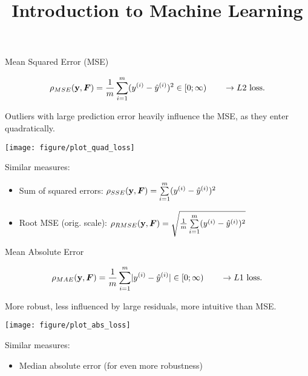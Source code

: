 \documentclass[11pt,compress,t,notes=noshow, xcolor=table]{beamer}
\title{Introduction to Machine Learning}
\institute{\href{https://compstat-lmu.github.io/lecture_i2ml/}{compstat-lmu.github.io/lecture\_i2ml}}
\date{}
\begin{document}
\sloppy


\begin{vbframe}{Mean Squared Error (MSE)}

$$
\rho_{MSE}(\mathbf{y}, \boldsymbol{F}) = \frac{1}{m} \sum\limits_{i=1}^m (y^{(i)}- \hat{y}^{(i)})^2 \in [0;\infty) \qquad \rightarrow L2 \text{ loss}.
$$

\begin{minipage}[c]{0.33\textwidth}
  \raggedright
  \small
  Outliers with large prediction error heavily influence the MSE, as they 
  enter quadratically.
\end{minipage}%
\begin{minipage}[c]{0.67\textwidth}
  \begin{knitrout}\scriptsize
  \color{fgcolor}
  {\texttt{[image: figure/plot\_quad\_loss]}}
\end{knitrout}
\end{minipage}

\small
Similar measures:

\begin{itemize}
  \small
  \item Sum of squared errors: $\rho_{SSE}(\mathbf{y}, \boldsymbol{F})=\sum\limits_{i=1}^m (y^{(i)}- \hat{y}^{(i)})^2$
  \item Root MSE (orig. scale): $\rho_{RMSE}(\mathbf{y}, \boldsymbol{F})= \sqrt{\frac{1}{m} \sum\limits_{i=1}^m (y^{(i)}- \hat{y}^{(i)})^2}$
\end{itemize}

\end{vbframe}


\begin{vbframe}{Mean Absolute Error}

$$ 
\rho_{MAE}(\mathbf{y}, \boldsymbol{F}) = \frac{1}{m} \sum\limits_{i=1}^m \rvert y^{(i)}- \hat{y}^{(i)} \rvert \in [0;\infty) \qquad \rightarrow L1 
\text{ loss}.
$$

\begin{minipage}[c]{0.33\textwidth}
  \raggedright
  \small
  More robust, less influenced by large residuals, more intuitive than MSE.
\end{minipage}%
\begin{minipage}[c]{0.67\textwidth}
  \begin{knitrout}\scriptsize
  \color{fgcolor}
  {\texttt{[image: figure/plot\_abs\_loss]}}
\end{knitrout}
\end{minipage}

\small
Similar measures:

\begin{itemize}
  \small
  \item Median absolute error (for even more robustness)
\end{itemize}

\end{vbframe}
\end{document}

